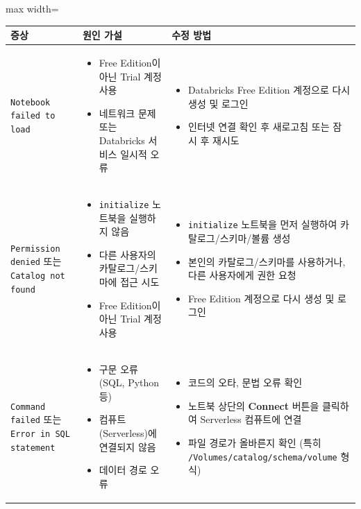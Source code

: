 \documentclass[11pt,a4paper]{article}
\begin{document}
\begin{itemize}
\begin{adjustbox}{max width=\textwidth}
\begin{tabular}{lll}
\toprule
\textbf{증상} & \textbf{원인 가설} & \textbf{수정 방법} \\
\midrule
\texttt{Notebook failed to load} &
\begin{itemize}
    \item Free Edition이 아닌 Trial 계정 사용
    \item 네트워크 문제 또는 Databricks 서비스 일시적 오류
\end{itemize} &
\begin{itemize}
    \item Databricks Free Edition 계정으로 다시 생성 및 로그인
    \item 인터넷 연결 확인 후 새로고침 또는 잠시 후 재시도
\end{itemize} \\
\texttt{Permission denied} 또는 \texttt{Catalog not found} &
\begin{itemize}
    \item \texttt{initialize} 노트북을 실행하지 않음
    \item 다른 사용자의 카탈로그/스키마에 접근 시도
    \item Free Edition이 아닌 Trial 계정 사용
\end{itemize} &
\begin{itemize}
    \item \texttt{initialize} 노트북을 먼저 실행하여 카탈로그/스키마/볼륨 생성
    \item 본인의 카탈로그/스키마를 사용하거나, 다른 사용자에게 권한 요청
    \item Free Edition 계정으로 다시 생성 및 로그인
\end{itemize} \\
\texttt{Command failed} 또는 \texttt{Error in SQL statement} &
\begin{itemize}
    \item 구문 오류 (SQL, Python 등)
    \item 컴퓨트(Serverless)에 연결되지 않음
    \item 데이터 경로 오류
\end{itemize} &
\begin{itemize}
    \item 코드의 오타, 문법 오류 확인
    \item 노트북 상단의 \textbf{Connect} 버튼을 클릭하여 Serverless 컴퓨트에 연결
    \item 파일 경로가 올바른지 확인 (특히 \texttt{/Volumes/catalog/schema/volume} 형식)

\end{itemize}
\end{tabular}
\end{adjustbox}
\end{itemize}
\end{document}
